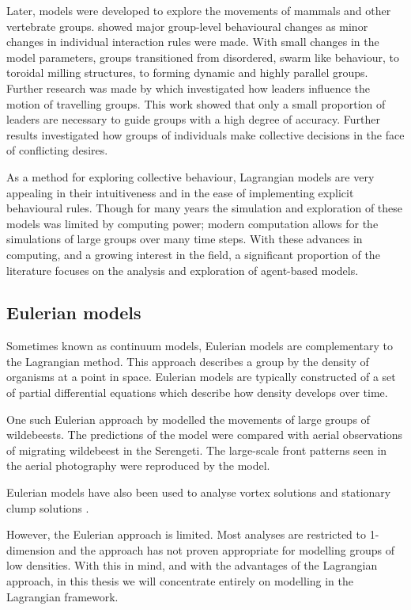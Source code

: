 Later, models were developed to explore the movements of mammals and other vertebrate groups. \citet{couzin02} showed major group-level behavioural changes as minor changes in individual interaction rules were made. With small changes in the model parameters, groups transitioned from disordered, swarm like behaviour, to toroidal milling structures, to forming dynamic and highly parallel groups. Further research was made by \citet{couzin05} which investigated how leaders influence the motion of travelling groups. This work showed that only a small proportion of leaders are necessary to guide groups with a high degree of accuracy. Further results investigated how groups of individuals make collective decisions in the face of conflicting desires.

As a method for exploring collective behaviour, Lagrangian models are very appealing in their intuitiveness and in the ease of implementing explicit behavioural rules. Though for many years the simulation and exploration of these models was limited by computing power; modern computation allows for the simulations of large groups over many time steps. With these advances in computing, and a growing interest in the field, a significant proportion of the literature focuses on the analysis and exploration of agent-based models.

\subsection{Eulerian models}
\label{ssec:eulerian_models}

Sometimes known as continuum models, Eulerian models are complementary to the Lagrangian method. This approach describes a group by the density of organisms at a point in space. Eulerian models are typically constructed of a set of partial differential equations which describe how density develops over time.

One such Eulerian approach by \citet{gueron93} modelled the movements of large groups of wildebeests. The predictions of the model were compared with aerial observations of migrating wildebeest in the Serengeti. The large-scale front patterns seen in the aerial photography were reproduced by the model.

Eulerian models have also been used to analyse vortex solutions \citep{topaz04} and stationary clump solutions \citep{topaz06}.

However, the Eulerian approach is limited. Most analyses are restricted to 1-dimension and the approach has not proven appropriate for modelling groups of low densities. With this in mind, and with the advantages of the Lagrangian approach, in this thesis we will concentrate entirely on modelling in the Lagrangian framework.

